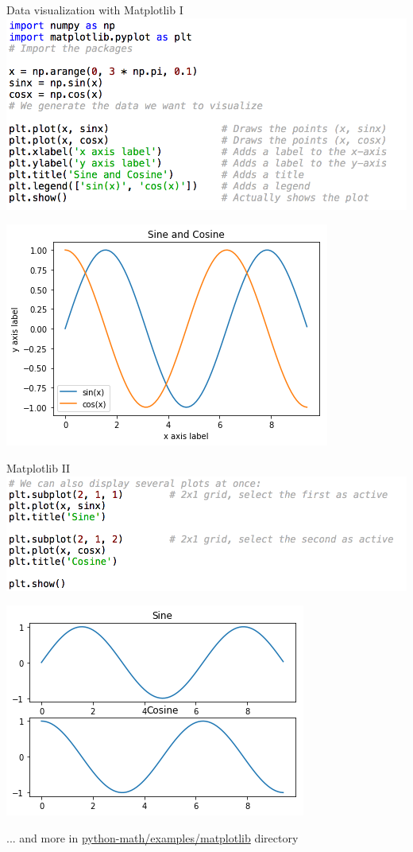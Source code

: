 \documentclass[11pt,unknownkeysallowed,usenames,dvipsnames]{beamer}
\begin{document}
\begin{frame}{Data visualization with Matplotlib I}
    \includegraphics[width=0.8\linewidth]{code-matplotlib1}
    
	\centering    \includegraphics[width=0.4\linewidth]{plot1}
\end{frame}

\begin{frame}{Matplotlib II}
	\includegraphics[width=0.9\linewidth]{code-matplotlib2}
	
	\centering    \includegraphics[width=0.4\linewidth]{plot2}
    
    ... and more in    
    \href{https://gitlab.unige.ch/Thibaut.Lunet/python-math/tree/master/examples/matplotlib}{python-math/examples/matplotlib} directory
\end{frame}
\end{document}

